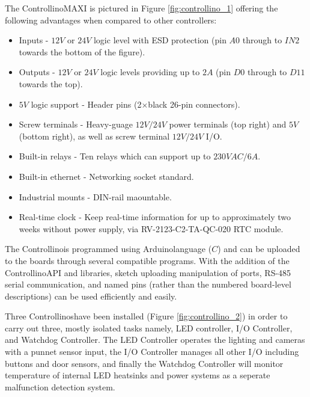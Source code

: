 \documentclass[fleqn,twoside,12pt]{report}
\begin{document}
The Controllino\texttrademark MAXI is pictured in Figure \ref{fig:controllino_1} offering the following advantages when compared to other controllers:


\begin{itemize}
	\item Inputs - $12V$ or $24V$ logic level with ESD protection (pin $A0$ through to $IN2$ towards the bottom of the figure). 
	\item Outputs - $12V$ or $24V$ logic levels providing up to $2A$ (pin $D0$ through to $D11$ towards the top).
	\item $5V$ logic support - Header pins (2$\times$black 26-pin connectors). 
	\item Screw terminals - Heavy-guage $12V/24V$ power terminals (top right) and $5V$ (bottom right), as well as screw terminal $12V/24V$ I/O. 
	\item Built-in relays - Ten relays which can support up to $230VAC/6A$.
	\item Built-in ethernet - Networking socket standard.
	\item Industrial mounts - DIN-rail maountable. 
	\item Real-time clock - Keep real-time information for up to approximately two weeks without power supply, via RV-2123-C2-TA-QC-020 RTC module.
\end{itemize}

The Controllino\texttrademark is programmed using Arduino\texttrademark language ($C$) and can be uploaded to the boards through several compatible programs. With the addition of the Controllino\texttrademark API and libraries, sketch uploading manipulation of ports, RS-485 serial communication, and named pins (rather than the numbered board-level descriptions) can be used efficiently and easily.

Three Controllinos\texttrademark have been installed (Figure \ref{fig:controllino_2}) in order to carry out three, mostly isolated tasks namely, LED controller, I/O Controller, and Watchdog Controller. The LED Controller operates the lighting and cameras with a punnet sensor input, the I/O Controller manages all other I/O including buttons and door sensors, and finally the Watchdog Controller will monitor temperature of internal LED heatsinks and power systems as a seperate malfunction detection system.
\end{document}
